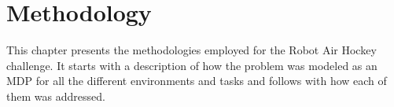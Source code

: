\chapter{Methodology}
\label{ch:methodology}

This chapter presents the methodologies employed for the Robot Air Hockey challenge. It starts with a description of how
the problem was modeled as an MDP for all the different environments and tasks and follows with how each of them was addressed.


